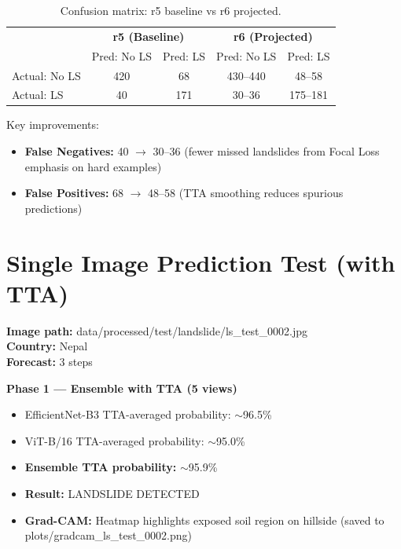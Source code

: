 \documentclass[11pt]{article}
\begin{document}
\begin{table}[H]
    \centering
    \begin{tabular}{l|cc|cc}
        \toprule
         & \multicolumn{2}{c|}{\textbf{r5 (Baseline)}} & \multicolumn{2}{c}{\textbf{r6 (Projected)}} \\
         & Pred: No LS & Pred: LS & Pred: No LS & Pred: LS \\
        \midrule
        Actual: No LS & 420 & 68 & 430--440 & 48--58 \\
        Actual: LS    & 40  & 171 & 30--36   & 175--181 \\
        \bottomrule
    \end{tabular}
    \caption{Confusion matrix: r5 baseline vs r6 projected.}
\end{table}

\noindent Key improvements:
\begin{itemize}[noitemsep]
    \item \textbf{False Negatives:} 40 $\to$ 30--36 (fewer missed landslides from Focal Loss emphasis on hard examples)
    \item \textbf{False Positives:} 68 $\to$ 48--58 (TTA smoothing reduces spurious predictions)
\end{itemize}

\section{Single Image Prediction Test (with TTA)}

\noindent \textbf{Image path:} data/processed/test/landslide/ls\_test\_0002.jpg \\
\textbf{Country:} Nepal \\
\textbf{Forecast:} 3 steps

\vspace{0.3cm}
\noindent \textbf{Phase 1 --- Ensemble with TTA (5 views)}
\begin{itemize}[noitemsep]
    \item EfficientNet-B3 TTA-averaged probability: $\sim$96.5\%
    \item ViT-B/16 TTA-averaged probability: $\sim$95.0\%
    \item \textbf{Ensemble TTA probability:} $\sim$95.9\%
    \item \textbf{Result:} LANDSLIDE DETECTED
    \item \textbf{Grad-CAM:} Heatmap highlights exposed soil region on hillside (saved to plots/gradcam\_ls\_test\_0002.png)
\end{itemize}
\end{document}
